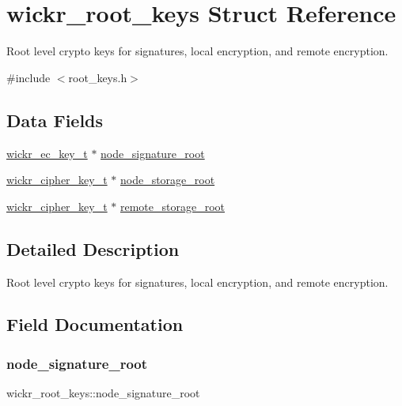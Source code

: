 \hypertarget{structwickr__root__keys}{}\section{wickr\+\_\+root\+\_\+keys Struct Reference}
\label{structwickr__root__keys}


Root level crypto keys for signatures, local encryption, and remote encryption.  




{\ttfamily \#include $<$root\+\_\+keys.\+h$>$}

\subsection*{Data Fields}
\begin{DoxyCompactItemize}
\item 
\hyperlink{structwickr__ec__key}{wickr\+\_\+ec\+\_\+key\+\_\+t} $\ast$ \hyperlink{structwickr__root__keys_af3a0ca7b48b356e118dea24c26cdd9f5}{node\+\_\+signature\+\_\+root}
\item 
\hyperlink{structwickr__cipher__key}{wickr\+\_\+cipher\+\_\+key\+\_\+t} $\ast$ \hyperlink{structwickr__root__keys_ada908a5fa4aaf7c8b9a4b496c99e595a}{node\+\_\+storage\+\_\+root}
\item 
\hyperlink{structwickr__cipher__key}{wickr\+\_\+cipher\+\_\+key\+\_\+t} $\ast$ \hyperlink{structwickr__root__keys_a9bf1ff10b669493393e2bf918f5d4090}{remote\+\_\+storage\+\_\+root}
\end{DoxyCompactItemize}


\subsection{Detailed Description}
Root level crypto keys for signatures, local encryption, and remote encryption. 

\subsection{Field Documentation}
\mbox{\label{structwickr__root__keys_af3a0ca7b48b356e118dea24c26cdd9f5}} 
\subsubsection{\texorpdfstring{node\+\_\+signature\+\_\+root}{node\_signature\_root}}
{\footnotesize\ttfamily wickr\+\_\+root\+\_\+keys\+::node\+\_\+signature\+\_\+root}

